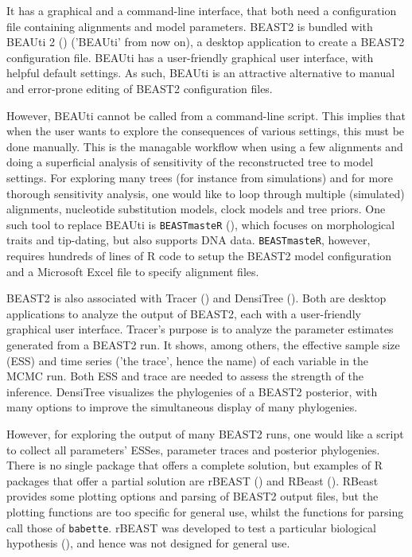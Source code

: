 \documentclass{article}
\begin{document}
It has a graphical and a command-line interface, 
that both need a configuration file containing 
alignments and model parameters.
BEAST2 is bundled with BEAUti 2 (\cite{drummond2012bayesian}) ('BEAUti' from now on), 
a desktop application to create a BEAST2 configuration file.
BEAUti has a user-friendly graphical user interface, with helpful
default settings.
As such, BEAUti is an attractive alternative 
to manual and error-prone editing of BEAST2 configuration files. 

However, BEAUti cannot be called from a command-line script.
This implies that when the user 
wants to explore the consequences of various settings, this must be done manually.
This is the managable workflow when using a few alignments and doing a superficial 
analysis of sensitivity of the reconstructed tree to model settings. 
For exploring many trees (for instance from simulations) and for
more thorough sensitivity analysis, one would like to loop through 
multiple (simulated) alignments, nucleotide substitution models, 
clock models and tree priors. 
One such tool to replace BEAUti is \verb;BEASTmasteR; (\cite{beastmaster}),
which focuses on morphological traits and tip-dating, but also 
supports DNA data. \verb;BEASTmasteR;, however, requires hundreds of
lines of R code to setup the BEAST2 model configuration 
and a Microsoft Excel file to specify alignment files.

BEAST2 is also associated with Tracer (\cite{tracer}) and 
DensiTree (\cite{DensiTree}). Both are desktop applications 
to analyze the output of BEAST2, each with a user-friendly graphical user interface. 
Tracer's purpose is to analyze the parameter estimates generated
from a BEAST2 run. It shows, among
others, the effective sample size (ESS) and time series ('the trace', 
hence the name) of each variable in the MCMC run. Both ESS and trace
are needed to assess the strength of the inference. 
DensiTree visualizes the phylogenies of a BEAST2 posterior, with
many options to improve the simultaneous display of many phylogenies.

However, for exploring the output of many BEAST2 runs, one would like a
script to collect all parameters' ESSes, parameter traces and posterior
phylogenies. There is no single package that offers a complete solution,
but examples of R packages that offer a partial solution are rBEAST
(\cite{rBEAST_ratmann}) and RBeast (\cite{RBeast_faria}). RBeast provides some
plotting options and parsing of BEAST2 output files, but the plotting
functions are too specific for general use, whilst the functions for parsing
call those of \verb;babette;. rBEAST was developed to test a 
particular biological hypothesis (\cite{ratmann2016}), 
and hence was not designed for general use.
\end{document}
